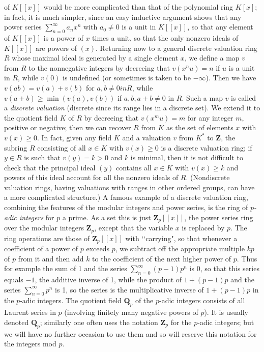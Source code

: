 \documentclass[10pt]{article}
\begin{document}
of $K[[x]]$ would be more complicated than that of the polynomial ring
$K[x]$; in fact, it is much simpler, since an easy inductive argument
shows that any power series $\sum_{n=0}^\infty a_n x^n$ with $a_0\ne0$
is a unit in $K[[x]]$, so that any element of $K[[x]]$ is a power of $x$
times a unit, so that the only nonzero ideals of $K[[x]]$ are powers of
$(x)$. Returning now to a general discrete valuation ring $R$ whose
maximal ideal is generated by a single element $x$, we define a map $v$
from $R$ to the nonnegative integers by decreeing that $v(x^n u) = n$ if
$u$ is a unit in $R$, while $v(0)$ is undefined (or sometimes is taken
to be $-\infty$). Then we have $v(ab) = v(a) + v(b)$ for $a,b\ne0 in R$,
while $v(a+b)\ge\min(v(a),v(b))$ if $a,b,a+b\ne0$ in $R$. Such a map $v$
is called a {\sl discrete valuation} (discrete since its range lies in a
discrete set). We extend it to the quotient field $K$ of $R$ by
decreeing that $v(x^m u) = m$ for any integer $m$, positive or negative;
then we can recover $R$ from $K$ as the set of elements $x$ with
$v(x)\ge0$. In fact, given any field $K$ and a valuation $v$ from $K^*$
to $\mathbf Z$, the subring $R$ consisting of all $x\in K$ with
$v(x)\ge0$ is a discrete valuation ring; if $y\in R$ is such that
$v(y)=k>0$ and $k$ is minimal, then it is not difficult to check that
the principal ideal $(y)$ contains all $x\in K$ with $v(x)\ge k$ and
powers of this ideal account for all the nonzero ideals of $R$.
(Nondiscrete valuation rings, having valuations with ranges in other
ordered groups, can have a more complicated structure.) A famous example
of a discrete valuation ring, combining the features of the modular
integers and power series, is the ring of {\sl $p$-adic integers} for
$p$ a prime. As a set this is just $\mathbf Z_p[[x]]$, the power series
ring over the modular integers $\mathbf Z_p$, except that the variable
$x$ is replaced by $p$. The ring operations are those of $\mathbf
Z_p[[x]]$ with \lq\lq carrying", so that whenever a coefficient of a
power of $p$ exceeds $p$, we subtract off the appropriate multiple $kp$
of $p$ from it and then add $k$ to the coefficient of the next higher
power of $p$. Thus for example the sum of 1 and the series
$\sum_{n=0}^\infty (p-1)p^n$ is 0, so that this series equals $-1$, the
additive inverse of 1, while the product of $1+(p-1)p$ and the series
$\sum_{n=0}^\infty p^n$ is 1, so the series is the multiplicative
inverse of $1+(p-1)p$ in the $p$-adic integers. The quotient field
$\mathbf Q_p$ of the $p$-adic integers consists of all Laurent series in
$p$ (involving finitely many negative powers of $p$). It is usually
denoted $\mathbf Q_p$; similarly one often uses the notation $\mathbf
Z_p$ for the $p$-adic integers; but we will have no further occasion to
use them and so will reserve this notation for the integers mod $p$.
\end{document}
